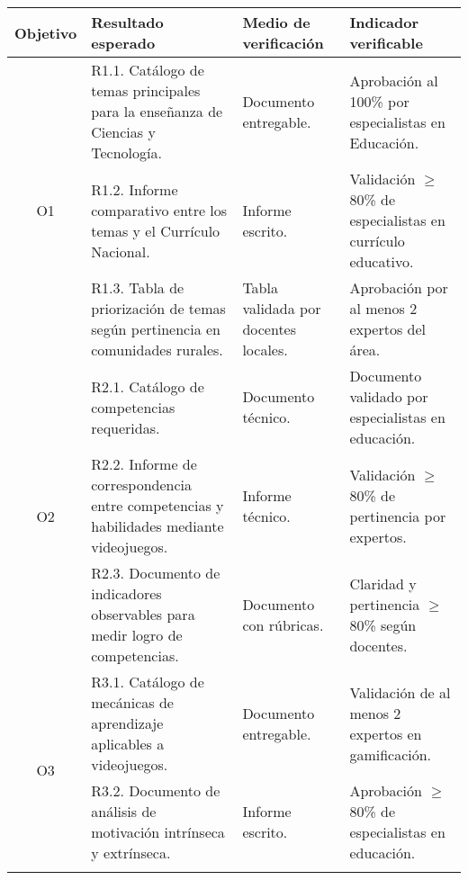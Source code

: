 \begin{table}[h]
\centering
\renewcommand{\arraystretch}{1.4}
\begin{tabularx}{\textwidth}{|c|X|X|X|}
\hline
\textbf{Objetivo} & \textbf{Resultado esperado} & \textbf{Medio de verificación} & \textbf{Indicador verificable} \\
\hline

\multirow{3}{*}{O1} 
& R1.1. Catálogo de temas principales para la enseñanza de Ciencias y Tecnología. 
& Documento entregable. 
& Aprobación al 100\% por especialistas en Educación. \\ \cline{2-4}

& R1.2. Informe comparativo entre los temas y el Currículo Nacional. 
& Informe escrito. 
& Validación $\geq$ 80\% de especialistas en currículo educativo. \\ \cline{2-4}

& R1.3. Tabla de priorización de temas según pertinencia en comunidades rurales. 
& Tabla validada por docentes locales. 
& Aprobación por al menos 2 expertos del área. \\ 
\hline

\multirow{3}{*}{O2} 
& R2.1. Catálogo de competencias requeridas. 
& Documento técnico. 
& Documento validado por especialistas en educación. \\ \cline{2-4}

& R2.2. Informe de correspondencia entre competencias y habilidades mediante videojuegos. 
& Informe técnico. 
& Validación $\geq$ 80\% de pertinencia por expertos. \\ \cline{2-4}

& R2.3. Documento de indicadores observables para medir logro de competencias. 
& Documento con rúbricas. 
& Claridad y pertinencia $\geq$ 80\% según docentes. \\ 
\hline

\multirow{3}{*}{O3} 
& R3.1. Catálogo de mecánicas de aprendizaje aplicables a videojuegos. 
& Documento entregable. 
& Validación de al menos 2 expertos en gamificación. \\ \cline{2-4}

& R3.2. Documento de análisis de motivación intrínseca y extrínseca. 
& Informe escrito. 
& Aprobación $\geq$ 80\% de especialistas en educación. \\ \cline{2-4}


\end{tabularx}
\end{table}
